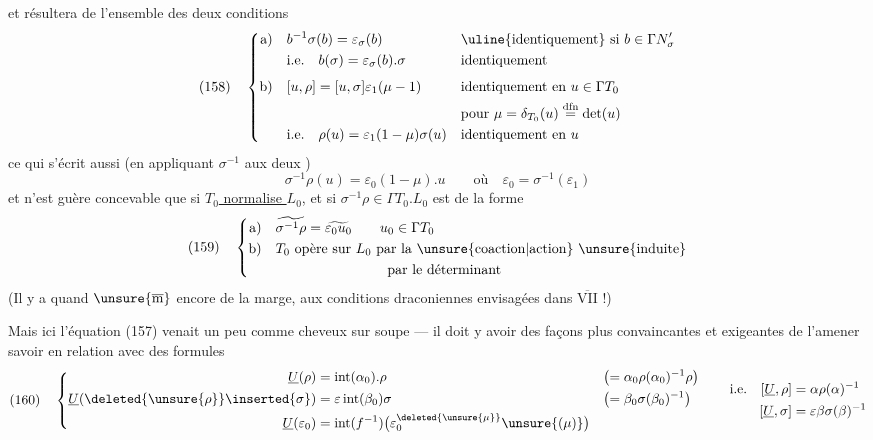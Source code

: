 
et résultera de l'ensemble des deux conditions
\[
(158)\quad
\left\{
\begin{aligned}
\text{a)}\quad&b^{-1}\sigma(b)=\varepsilon_\sigma(b)
&&\text{\uline{identiquement} si }b\in\Gamma N'_\sigma\\
&\text{i.e.}\quad b(\sigma)=\varepsilon_\sigma(b).\sigma
&&\text{identiquement}\\[4pt]
\text{b)}\quad&[u,\rho]=[u,\sigma]\varepsilon_1(\mu-1)
&&\text{identiquement en }u\in\Gamma T_0\\
&&&\text{pour }\mu=\delta_{T_0}(u)\overset{\mathrm{dfn}}=\det(u)\\
&\text{i.e.}\quad\rho(u)=\varepsilon_1(1-\mu)\sigma(u)
&&\text{identiquement en }u
\end{aligned}
\right.
\]
ce qui s'écrit aussi (en appliquant $\sigma^{-1}$ aux deux )
\[
\sigma^{-1}\rho(u)=\varepsilon_0(1-\mu).u
\qquad\text{où}\quad\varepsilon_0=\sigma^{-1}(\varepsilon_1)
\]
et n'est guère concevable que si \uline{$T_0$ normalise $L_0$}, et si $\sigma^{-1}\rho\in\Gamma T_0.L_0$  est de la forme
\[
(159)\quad
\left\{
\begin{aligned}
\text{a)}\quad&\widetilde{\sigma^{-1}\rho}=\widetilde{\varepsilon_0u_0}
\qquad u_0\in\Gamma T_0\\
\text{b)}\quad& T_0\text{ opère sur }L_0\text{ par la \unsure{coaction|action} \unsure{induite}}\\
&\hspace{8em}\text{par le déterminant}
\end{aligned}
\right.
\]
(Il y a quand $\unsure{\overline{\mathrm m}}$ encore de la marge,  aux conditions draconiennes envisagées dans \uline{$\overline{\mathrm{VII}}$} !)

Mais ici l'équation (157) venait un peu comme cheveux sur soupe --- il doit y avoir des façons plus convaincantes et exigeantes de l'amener savoir  en relation avec des formules
\[
(160)\quad
\left\{
\begin{aligned}
\underline U(\rho)&=\operatorname{int}(\alpha_0).\rho
&&\bigl(=\alpha_0\rho(\alpha_0)^{-1}\rho\bigr)\\
\underline U(\deleted{\unsure{\rho}}\inserted{\sigma})&=
\varepsilon\operatorname{int}(\beta_0)\sigma
&&\bigl(=\beta_0\sigma(\beta_0)^{-1}\bigr)\\
\underline U(\varepsilon_0)&=\operatorname{int}(f^{-1})
\bigl(\varepsilon_0^{\deleted{\unsure{\mu}}}\unsure{(\mu)}\bigr)
\end{aligned}
\right.
\qquad
\begin{aligned}
\text{i.e.}\quad[\underline U,\rho]&=\alpha\rho(\alpha)^{-1}\\
[\underline U,\sigma]&=\varepsilon\beta\sigma(\beta)^{-1}
\end{aligned}
\]

